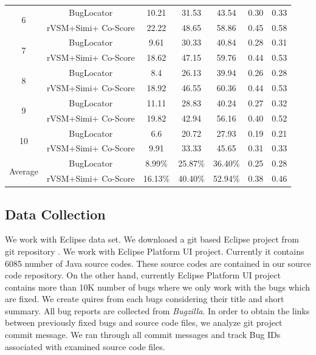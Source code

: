 \documentclass[conference]{IEEEtran}
\begin{document}
\begin{table}[htbp]
{\begin{tabular}{|c|c|c|c|c|c|c|}
			\multirow{2}{*}{6}  &BugLocator     &  10.21& 31.53&43.54& 0.30 & 0.33 \\  \cline{2-7}
			& rVSM+Simi+ Co-Score
			&22.22 &
			48.65 &
			58.86 & 0.45 &
			0.58     \\  \hline
			\multirow{2}{*}{7}  &BugLocator     &  9.61& 30.33&40.84& 0.28 & 0.31 \\ \cline{2-7}
			& rVSM+Simi+ Co-Score
			&18.62 &
			47.15 &
			59.76 & 0.44 &
			0.53     \\  \hline
			\multirow{2}{*}{8}  &BugLocator     &  8.4& 26.13&39.94& 0.26 & 0.28 \\ \cline{2-7}
			& rVSM+Simi+ Co-Score
			&18.92 &
			46.55 &
			60.36 & 0.44 &
			0.53    \\  \hline
			\multirow{2}{*}{9}  &BugLocator     &  11.11& 28.83&40.24& 0.27 & 0.32 \\  \cline{2-7}
			& rVSM+Simi+ Co-Score
			&19.82 &
			42.94 &
			56.16 & 0.40 &
			0.52    \\  \hline
			\multirow{2}{*}{10}  &BugLocator     &  6.6& 20.72&27.93& 0.19 & 0.21 \\  \cline{2-7}
			& rVSM+Simi+ Co-Score
			&9.91 &
			33.33 &
			45.65 & 0.31 &
			0.33    \\  \hline \hline
			\multirow{2}{*}{Average}       &BugLocator     &  8.99\%& 25.87\%&36.40\%& 0.25 & 0.28  \\ \cline{2-7}
			& rVSM+Simi+ Co-Score                                                                                                                         & 16.13\%                                                 & 40.40\%                                                 & 52.94\%                                                  &   0.38  &  0.46    \\ 
			\hline
\end{tabular}}
\centering
\end{table}

\subsection{Data Collection}
We work with Eclipse data set. We downloaed a git based Eclipse project from git repository \cite{eclipseGit}. We work with Eclipse Platform UI project. Currently it contains 6085 number of Java source codes. These source codes are contained in our source code repository. On the other hand, currently Eclipse Platform UI project contains more than 10K number of bugs where we only work with the bugs which are fixed. We create quires from each bugs considering their title and short summary.
All bug reports are collected from \textit{Bugzilla}. In order to obtain the links between previously fixed bugs and source code files, we analyze git project commit message. We ran through all commit messages and track Bug IDs associated with examined source code files.
\end{document}

